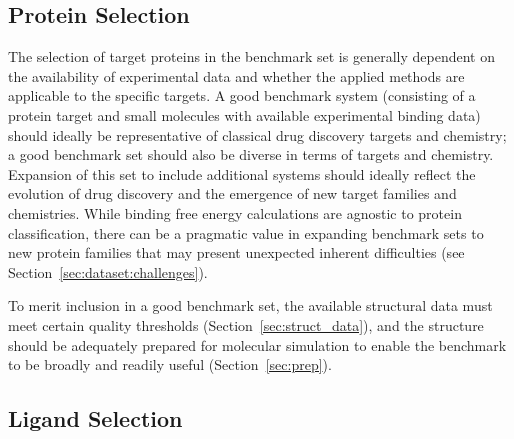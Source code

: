 \documentclass[9pt,bestpractices]{livecoms}
\begin{document}
\subsection{Protein Selection}
\label{sec:dataset:proteins}
The selection of target proteins in the benchmark set is generally dependent
on the availability of experimental data and whether the applied methods are applicable to the specific targets.
%
A good benchmark system (consisting of a protein target and small molecules with available experimental binding data) should ideally be representative of classical drug discovery targets and chemistry; a good benchmark set should also be diverse in terms of targets and chemistry. 
Expansion of this set to include additional systems should ideally reflect the evolution of drug discovery and the emergence of new target families and chemistries.
%
While binding free energy calculations are agnostic to protein classification, there can be a pragmatic value in expanding benchmark sets to new protein families that may present unexpected inherent difficulties (see Section~\ref{sec:dataset:challenges}).

To merit inclusion in a good benchmark set, the available structural data must meet certain quality thresholds (Section~\ref{sec:struct_data}), and the structure should be adequately prepared for molecular simulation to enable the benchmark to be broadly and readily useful (Section~\ref{sec:prep}).

\subsection{Ligand Selection}
\label{sec:dataset:ligands}
\end{document}
